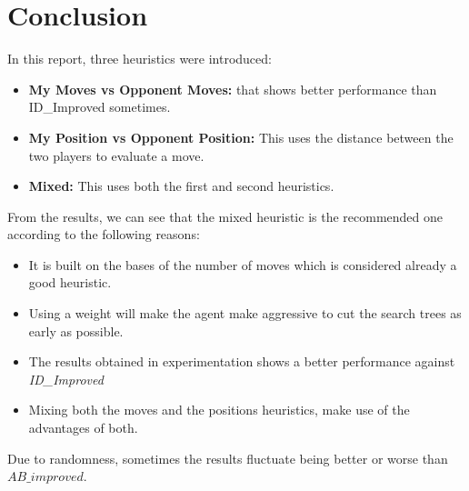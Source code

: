 \documentclass[10pt, a4paper,english]{article}
\begin{document}
\section{Conclusion}

In this report, three heuristics were introduced:

\begin{itemize}
\item \textbf{My Moves vs Opponent Moves:} that shows better performance than ID\_Improved sometimes. 
\item \textbf{My Position vs Opponent Position:} This uses the distance between the two players to evaluate a move.
\item \textbf{Mixed:} This uses both the first and second heuristics.
\end{itemize}

From the results, we can see that the mixed heuristic is the recommended one according to the following reasons:

\begin{itemize}
  \item It is built on the bases of the number of moves which is considered already a good heuristic.
  \item Using a weight will make the agent make aggressive to cut the search trees as early as possible.
  \item The results obtained in experimentation shows a better performance against \textit{ID\_Improved}
  \item Mixing both the moves and the positions heuristics, make use of the advantages of both.
\end{itemize}


Due to randomness, sometimes the results fluctuate being better or worse than $AB\_improved$.





\end{document}
